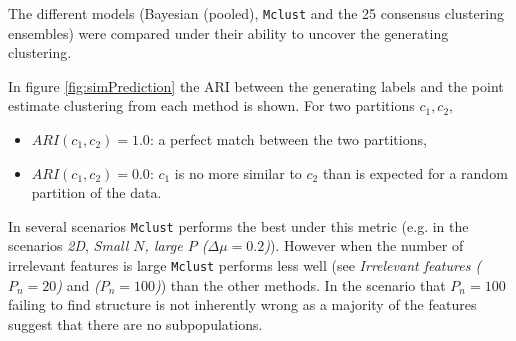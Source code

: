 \documentclass[]{article}
\begin{document}
The different models (Bayesian (pooled), \texttt{Mclust} and the 25 consensus clustering ensembles) were compared under their ability to uncover the generating clustering.

In figure \ref{fig:simPrediction} the ARI between the generating labels and the point estimate clustering from each method is shown. For two partitions $c_1, c_2$, 
\begin{itemize}
	\item $ARI(c_1, c_2) = 1.0$: a perfect match between the two partitions,
	\item $ARI(c_1, c_2) = 0.0$: $c_1$ is no more similar to $c_2$ than is expected for a random partition of the data.
\end{itemize}
In several scenarios \texttt{Mclust} performs the best under this metric (e.g. in the scenarios \emph{2D}, \emph{Small $N$, large $P$ ($\Delta \mu = 0.2$)}). However when the number of irrelevant features is large \texttt{Mclust} performs less well (see \emph{Irrelevant features ($P_n = 20$)} and \emph{($P_n = 100$)}) than the other methods. In the scenario that $P_n = 100$ failing to find structure is not inherently wrong as a majority of the features suggest that there are no subpopulations.

\end{document}
